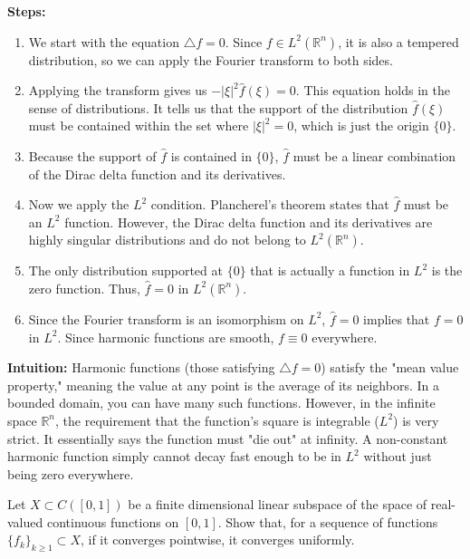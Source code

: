 \begin{solution}
\textbf{Steps:}
\begin{enumerate}
    \item We start with the equation $\triangle f = 0$. Since $f \in L^2(\mathbb{R}^n)$, it is also a tempered distribution, so we can apply the Fourier transform to both sides.
    \item Applying the transform gives us $-|\xi|^2 \hat{f}(\xi) = 0$. This equation holds in the sense of distributions. It tells us that the support of the distribution $\hat{f}(\xi)$ must be contained within the set where $|\xi|^2 = 0$, which is just the origin $\{0\}$.
    \item Because the support of $\hat{f}$ is contained in $\{0\}$, $\hat{f}$ must be a linear combination of the Dirac delta function and its derivatives.
    \item Now we apply the $L^2$ condition. Plancherel's theorem states that $\hat{f}$ must be an $L^2$ function. However, the Dirac delta function and its derivatives are highly singular distributions and do not belong to $L^2(\mathbb{R}^n)$.
    \item The only distribution supported at $\{0\}$ that is actually a function in $L^2$ is the zero function. Thus, $\hat{f} = 0$ in $L^2(\mathbb{R}^n)$.
    \item Since the Fourier transform is an isomorphism on $L^2$, $\hat{f} = 0$ implies that $f = 0$ in $L^2$. Since harmonic functions are smooth, $f \equiv 0$ everywhere.
\end{enumerate}

\textbf{Intuition:}
Harmonic functions (those satisfying $\triangle f = 0$) satisfy the "mean value property," meaning the value at any point is the average of its neighbors. In a bounded domain, you can have many such functions. However, in the infinite space $\mathbb{R}^n$, the requirement that the function's square is integrable ($L^2$) is very strict. It essentially says the function must "die out" at infinity. A non-constant harmonic function simply cannot decay fast enough to be in $L^2$ without just being zero everywhere.
\end{solution}

\begin{exercise}
\label{analysis:2021:2}
Let $X\subset C([0,1])$ be a finite dimensional linear subspace of the space of real-valued continuous functions on $[0,1]$. Show that, for a sequence of functions $\{f_k\}_{k\geq 1}\subset X$, if it converges pointwise, it converges uniformly.
\end{exercise}

